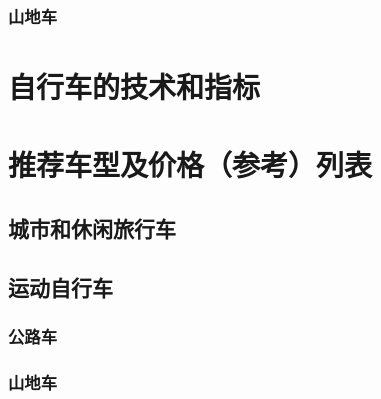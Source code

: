 \documentclass[11pt]{book}
\begin{document}
    \subsection{山地车}\label{subsec:MTB}
    

    \chapter{自行车的技术和指标}\label{ch:tech&index}
    

    \appendix

    \chapter{推荐车型及价格（参考）列表}\label{ch:(ref)model&price}
    

    \section{城市和休闲旅行车}\label{sec:(ref)urban&travelList}
    

    \section{运动自行车}\label{sec:(ref)sportsList}
    

    \subsection{公路车}\label{subsec:(ref)roadList}
    

    \subsection{山地车}\label{subsec:(ref)MTBList}
    
\end{document}
